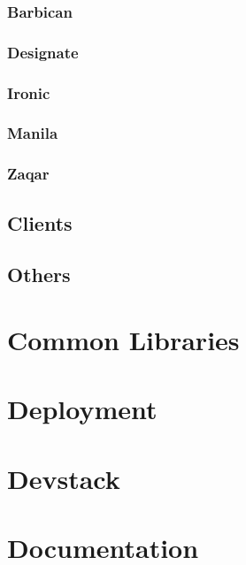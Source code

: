\documentclass[a4wide,11pt]{report}
\begin{document}
\newpage 
\subsubsection{Barbican}


\newpage 
\subsubsection{Designate}


\newpage 
\subsubsection{Ironic}


\newpage 
\subsubsection{Manila}


\newpage 
\subsubsection{Zaqar}


\newpage
\subsection{Clients}


\newpage
\subsection{Others}


\newpage
\section{Common Libraries}


\newpage
\section{Deployment}


\newpage
\section{Devstack}


\newpage
\section{Documentation}

\end{document}
